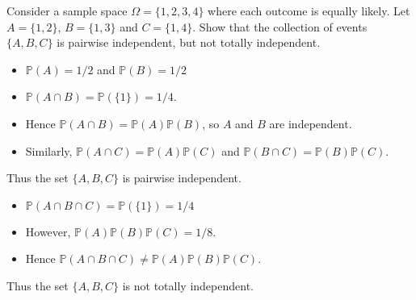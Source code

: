 \documentclass[lecture]{csm}
\newcommand{\prob}{\mathbb{P}}
\def\it{\item}
\def\bit{\begin{itemize}}
\def\eit{\end{itemize}}
\begin{document}
\begin{example}
Consider a sample space $\Omega=\{1,2,3,4\}$ where each outcome is equally likely. Let $A=\{1,2\}$, $B=\{1,3\}$ and $C=\{1,4\}$. Show that the collection of events $\{A,B,C\}$ is pairwise independent, but not totally independent.
\end{example}
\begin{solution}
\bit
\it $\prob(A)=1/2$ and $\prob(B)=1/2$
\it $\prob(A\cap B)=\prob(\{1\})=1/4$. 
\it Hence $\prob(A\cap B) = \prob(A)\prob(B)$, so $A$ and $B$ are independent. 
\it Similarly, $\prob(A\cap C) = \prob(A)\prob(C)$ and $\prob(B\cap C) = \prob(B)\prob(C)$.
\eit
Thus the set $\{A,B,C\}$ is pairwise independent. 
\bit
\it $\prob(A\cap B\cap C)=\prob(\{1\}) = 1/4$
\it However, $\prob(A)\prob(B)\prob(C)=1/8$. 
\it Hence $\prob(A\cap B\cap C)\neq \prob(A)\prob(B)\prob(C)$.
\eit
Thus the set $\{A,B,C\}$ is not totally independent.
\end{solution}


\end{document}
